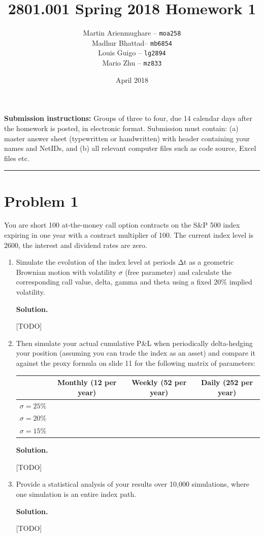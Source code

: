 \documentclass[12pt]{article}
\title{\vspace{-3cm}2801.001 Spring 2018 Homework 1 }
\author{Martin Arienmughare -- \texttt{moa258}\\
		Madhur Bhattad-- \texttt{mb6854}\\
		Louis Guigo -- \texttt{lg2894}\\
		Mario Zhu -- \texttt{mz833}}
\date{April 2018}
\newenvironment{solution}{\vspace{0.2cm} \textbf{Solution.}}{}
\begin{document}
	\maketitle
\textbf{Submission instructions:} Groups of three to four, due 14 calendar days after the homework is posted, in
electronic format. Submission must contain: (a) master answer sheet (typewritten or handwritten) with
header containing your names and NetIDs, and (b) all relevant computer files such as code source, Excel
files etc.

	\noindent
	\rule{\linewidth}{0.4pt}
	
	\section*{Problem 1}
You are short 100 at-the-money call option contracts on the S\&P 500 index expiring in one year with a contract multiplier of 100. The current index level is 2600, the interest and dividend rates are zero.

	\begin{enumerate}[label=(\alph*)]
		\item Simulate the evolution of the index level at periods Δt as a geometric Brownian motion with volatility $\sigma$ (free parameter) and calculate the corresponding call value, delta, gamma and theta using a fixed 20\% implied volatility.
		
		\begin{solution}
		
		[TODO]
	
		\end{solution}
		\item Then simulate your actual cumulative P\&L when periodically delta-hedging your position (assuming you can trade the index as an asset) and compare it against the proxy formula on slide 11 for the following matrix of parameters:
		
		\linethickness{1pt}
		\setlength{\arrayrulewidth}{1pt}
		\begin{tabular}{|c|c|c|c|}
			\hline
			\backslashbox{$\sigma$}{$\Delta t$} & Monthly (12 per year) & Weekly (52 per year) & Daily (252 per year) \\ \hline
			$\sigma = 25 \%$ &  &  &  \\ \hline
			$\sigma = 20 \%$ &  &  &  \\ \hline
			$\sigma = 15 \%$ &  &  &  \\ \hline
		\end{tabular} 
	
		\begin{solution}
		
		[TODO]
		
		\end{solution}
		
		\item Provide a statistical analysis of your results over 10,000 simulations, where one simulation is an entire index path.
		
		\begin{solution}
		
		[TODO]
			
		\end{solution}
	\end{enumerate}
	
\end{document}

